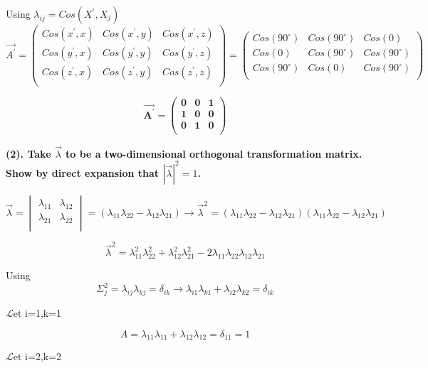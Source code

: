 \documentclass[12pt]{article}
\begin{document}
Using $
\lambda_{ij} = Cos(X^{\prime}, X_j)
$
$$
\vec{A^{\prime}} = 
\begin{pmatrix}
    Cos(x^{\prime}, x) & Cos(x^{\prime}, y) & Cos(x^{\prime}, z) \\
	Cos(y^{\prime}, x) & Cos(y^{\prime}, y) & Cos(y^{\prime}, z)  \\
	Cos(z^{\prime}, x) & Cos(z^{\prime}, y) & Cos(z^{\prime}, z) \\
\end{pmatrix} =
\begin{pmatrix}
    Cos(90^{\circ}) & Cos(90^{\circ}) & Cos(0) \\
	Cos(0) & Cos(90^{\circ}) & Cos(90^{\circ})  \\
	Cos(90^{\circ}) & Cos(0) & Cos(90^{\circ}) \\
\end{pmatrix}
$$

$$
\boldsymbol
{
\vec{A^{\prime}} =
\begin{pmatrix}
    0 & 0 & 1 \\
	1 & 0 & 0  \\
	0 & 1 & 0 \\
\end{pmatrix}
}
$$

\newpage
\textbf{(2). Take $\vec{\lambda}$ to be a two-dimensional orthogonal transformation matrix. Show by
direct expansion that $|\vec{\lambda}|^2 = 1$.}

$$
\vec{\lambda} =
\begin{vmatrix}
	\lambda_{11} & \lambda_{12} \\
	\lambda_{21} & \lambda_{22}\\
\end{vmatrix}
= (\lambda_{11}\lambda_{22} - \lambda_{12}\lambda_{21}) \rightarrow \vec{\lambda}^2 = (\lambda_{11}\lambda_{22} - \lambda_{12}\lambda_{21})(\lambda_{11}\lambda_{22} - \lambda_{12}\lambda_{21}) 
$$

$$
\vec{\lambda}^2 = \lambda_{11}^2\lambda_{22}^2 + \lambda_{12}^2\lambda_{21}^2 - 2\lambda_{11}\lambda_{22}\lambda_{12}\lambda_{21}
$$

Using 
$$
\Sigma^{2}_{j} = \lambda_{ij}\lambda_{kj} = \delta_{ik} \rightarrow \lambda_{i1}\lambda_{k1} + \lambda_{i2}\lambda_{k2} = \delta_{ik}
$$

$\mathscr{L}$et i=1,k=1

$$
A = \lambda_{11}\lambda_{11} + \lambda_{12}\lambda_{12} = \delta_{11} = 1
$$

$\mathscr{L}$et i=2,k=2
\end{document}
